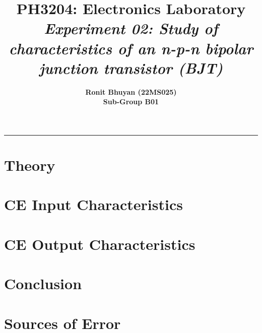 \documentclass[12pt]{article}
\title{
  \vspace{-2cm}
  \Huge \textbf{PH3204: Electronics Laboratory} \\[0.4cm]
  \Large \textit{Experiment 02: Study of characteristics of an n-p-n bipolar junction transistor (BJT)}
}
\author{
  \textbf{Ronit Bhuyan (22MS025)} \\[0.2cm]
  \textbf{Sub-Group B01}
}
\date{}
\begin{document}
\maketitle

\tableofcontents
\noindent\rule{\textwidth}{0.4pt}
\newpage

\section{Theory}
\section{CE Input Characteristics}
\section{CE Output Characteristics}
\section{Conclusion}
\section{Sources of Error}
 
\end{document}
